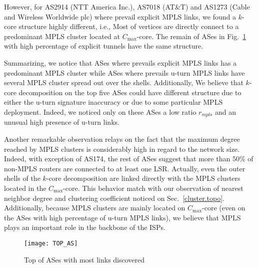However, for  AS2914 (NTT America Inc.), AS7018 (AT\&T) and AS1273 (Cable and
Wireless Worldwide plc) where prevail explicit MPLS links, we found a $k$-core
structure highly different, i.e., Most of vertices are directly connect to a
predominant MPLS cluster located at $C_{\max}$-core. The remain of  ASes in
Fig.~\ref{top_as} with high percentage of explicit tunnels have the same
structure.

Summarizing, we notice that ASes where prevails explicit MPLS links has a 
predominant MPLS cluster while ASes where prevails u-turn MPLS links have several MPLS cluster spread out over the shells. 
Additionally, We believe that $k$-core decomposition  on the top five ASes could have different structure due to either  the u-turn signature inaccuracy or due to some particular MPLS
deployment. Indeed, we noticed only on these ASes a low ratio $r_{mpls}$ and an
unusual  high presence of  u-turn links.

Another remarkable observation  relays on the fact that the maximum degree
reached by MPLS clusters is considerably high in regard to the network
size. Indeed, with exception of AS174, the rest of ASes suggest that more than
$50\%$ of non-MPLS routers are connected  to at least one LSR. Actually, even
the outer shells of the $k$-core decomposition are linked directly with the
MPLS clusters located in the $C_{\max}$-core. This behavior match with
our observation of nearest neighbor degree and clustering coefficient noticed on
Sec.~\ref{cluster.topo}. Additionally, because MPLS clusters are
mainly located on $C_{\max}$-core (even on the ASes with high percentage of
u-turn MPLS links), we believe that MPLS plays an important role in the
backbone of the ISPs.

\begin{figure}[!htb]
  \begin{center}
    \texttt{[image: TOP\_AS]}
  \end{center}
  \caption{Top of ASes with most links discovered}
  \label{top_as}
\end{figure}

